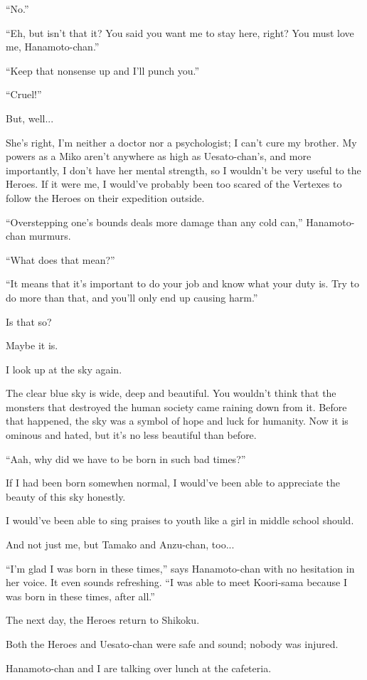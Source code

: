 ``No.''

``Eh, but isn't that it? You said you want me to stay here, right? You must love me, Hanamoto-chan.''

``Keep that nonsense up and I'll punch you.''

``Cruel!''

But, well...

She's right, I'm neither a doctor nor a psychologist; I can't cure my brother. My powers as a Miko aren't anywhere as high as Uesato-chan's, and more importantly, I don't have her mental strength, so I wouldn't be very useful to the Heroes. If it were me, I would've probably been too scared of the Vertexes to follow the Heroes on their expedition outside.

``Overstepping one's bounds deals more damage than any cold can,'' Hanamoto-chan murmurs.

``What does that mean?''

``It means that it's important to do your job and know what your duty is. Try to do more than that, and you'll only end up causing harm.''

Is that so?

Maybe it is.

I look up at the sky again.

The clear blue sky is wide, deep and beautiful. You wouldn't think that the monsters that destroyed the human society came raining down from it. Before that happened, the sky was a symbol of hope and luck for humanity. Now it is ominous and hated, but it's no less beautiful than before.

``Aah, why did we have to be born in such bad times?''

If I had been born somewhen normal, I would've been able to appreciate the beauty of this sky honestly.

I would've been able to sing praises to youth like a girl in middle school should.

And not just me, but Tamako and Anzu-chan, too...

``I'm glad I was born in these times,'' says Hanamoto-chan with no hesitation in her voice. It even sounds refreshing.  ``I was able to meet Koori-sama because I was born in these times, after all.''

The next day, the Heroes return to Shikoku.

Both the Heroes and Uesato-chan were safe and sound; nobody was injured.

Hanamoto-chan and I are talking over lunch at the cafeteria.


